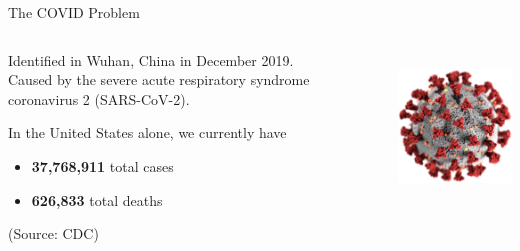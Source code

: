 \begin{slide}{The COVID Problem}
	\centering
	\begin{columns}[T]
		\begin{column}{.6\textwidth}
			Identified in Wuhan, China in December 2019. \\
	
			Caused by the severe acute respiratory syndrome coronavirus 2 (SARS-CoV-2). 
	
			\vspace{1cm}
	
			In the United States alone, we currently have
			\begin{itemize}
				\item \textbf{37,768,911} total cases
				\item \textbf{626,833} total deaths
			\end{itemize}
			{\tiny (Source: CDC)}
		\end{column}
		\begin{column}{.2\textwidth}
			\includegraphics[height=4cm]{images/covid-19}
		\end{column}
	\end{columns}
\end{slide}